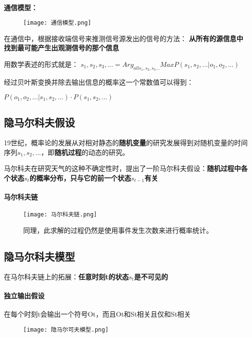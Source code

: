 \documentclass[UTF8]{article}
\begin{document}
	~

	\textbf{通信模型：}

	\begin{figure}[!htb]
	\centering
	\texttt{[image: 通信模型.png]}
	\end{figure}

	在通信中，根据接收端信号来推测信号源发出的信号的方法：
	\textbf{从所有的源信息中找到最可能产生出观测信号的那个信息}

	用数学表述的形式就是：
	$s_1,s_2,s_3,...=Arg_{all s_1,s_2,s_3...} Max P(s_1,s_2,...|o_1,o_2,...)$

	经过贝叶斯变换并除去输出信息的概率这一个常数值可以得到：

	$P(o_1,o_2,...|s_1,s_2,...)\cdot P(s_1,s_2,...)$

	\subsection{隐马尔科夫假设}

	19世纪，概率论的发展从对相对静态的\textbf{随机变量}的研究发展得到对随机变量的时间序列$s_1,s_2,...$，即\textbf{随机过程}的动态的研究。

	马尔科夫在研究天气的这种不确定性时，提出了一阶马尔科夫假设：\textbf{随机过程中各个状态$s_t$的概率分布，只与它的前一个状态$s_{t-1}$有关}

	\paragraph{马尔科夫链}
	\begin{figure}[!htb]
	\centering
	\texttt{[image: 马尔科夫链.png]}
	
	同理，此求解的过程仍然是使用事件发生次数来进行概率统计。
	\end{figure}

	\subsection{隐马尔科夫模型}
	在马尔科夫链上的拓展：\textbf{任意时刻t的状态$s_t$是不可见的}

	\paragraph{独立输出假设}
	在每个时刻t会输出一个符号Ot，而且Ot和St相关且仅和St相关
	\begin{figure}[!htb]
	\centering
	\texttt{[image: 隐马尔可夫模型.png]}
	\end{figure}
\end{document}
